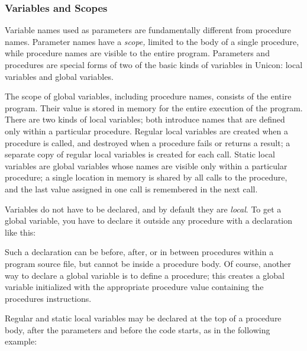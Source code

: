 \subsubsection{Variables and Scopes}
Variable names used as parameters are fundamentally
different from procedure names. Parameter names have a
\textit{scope,} limited to the body of a single
procedure, while procedure names are visible to the entire program.
Parameters and procedures are special forms of two of the basic kinds
of variables in Unicon: local variables and global variables.

The scope of global variables, including
procedure names, consists of the entire program. Their value is stored
in memory for the entire execution of the program. There are two kinds
of local variables; both introduce names that
are defined only within a particular procedure. Regular local variables
are created when a procedure is called, and destroyed when a procedure
fails or returns a result; a separate copy of regular local variables
is created for each call. Static local
variables are global variables whose names are visible only within a
particular procedure; a single location in memory is shared by all
calls to the procedure, and the last value assigned in one call is
remembered in the next call.

Variables do not have to be declared, and by default they are
\textit{local}. To get a global variable, you have to declare it
outside any procedure with a declaration like this:


Such a declaration can be before, after, or in between procedures within
a program source file, but cannot be inside a procedure body. Of
course, another way to declare a global variable is to define a
procedure; this creates a global variable initialized with the
appropriate procedure value containing the procedure{\textquotesingle}s
instructions.

Regular and static local variables may be declared at the top of a
procedure body, after the parameters and before the code starts, as in
the following example:



